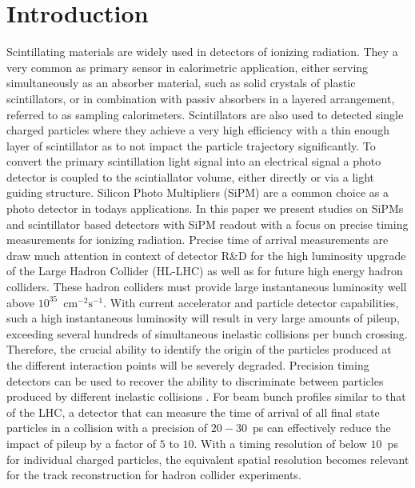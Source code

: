 \section{Introduction}
\label{sec:introduction}

Scintillating materials are widely used in detectors of ionizing radiation. 
They a very common as primary sensor in calorimetric application, either serving simultaneously as an absorber material, such as solid crystals of plastic scintillators, or in combination with passiv absorbers in a layered arrangement, referred to as sampling calorimeters. Scintillators are also used to detected single charged particles where they achieve a very high efficiency with a thin enough layer of scintillator as to not impact the particle trajectory significantly.
To convert the primary scintillation light signal into an electrical signal a photo detector is coupled to the scintiallator volume, either directly or via a light guiding structure.
Silicon Photo Multipliers (SiPM) are a common choice as a photo detector in todays applications.
In this paper we present studies on SiPMs and scintillator based detectors with SiPM readout with a focus on precise timing measurements for ionizing radiation. 
%
%
Precise time of arrival measurements are draw much attention in context of detector R\&D for the high luminosity upgrade of the Large Hadron Collider (HL-LHC) as well as for future high energy hadron colliders.  
These hadron colliders must provide large 
instantaneous luminosity well above $10^{35}$~$\mathrm{cm}^{-2}\mathrm{s}^{-1}$.
With current accelerator and particle detector capabilities, such a high 
instantaneous luminosity will result in very large amounts
of pileup, exceeding several hundreds of simultaneous inelastic collisions per
bunch crossing. Therefore, the crucial ability to identify the origin 
of the particles produced at the different interaction points will be severely 
degraded. Precision timing detectors can be used to recover the ability to 
discriminate between particles produced by different inelastic collisions \cite{adielba}.
For beam bunch profiles similar to that of the LHC, a detector 
that can measure the time of arrival of all final state particles in a collision
with a precision of $20-30$~ps can effectively reduce the impact of
pileup by a factor of $5$ to $10$. 
%
% 
% 
With a timing resolution of below $10$~ps for individual charged particles, the equivalent spatial 
resolution becomes relevant for the track reconstruction \cite{4dtracking} for hadron collider experiments.
